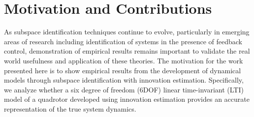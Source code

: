 \section{Motivation and Contributions}
As subspace identification techniques continue to evolve, particularly in emerging areas of research including identification of systems in the presence of feedback control, demonstration of empirical results remains important to validate the real world usefulness and application of these theories. The motivation for the work presented here is to show empirical results from the development of dynamical models through subspace identification with innovation estimation. Specifically, we analyze whether a six degree of freedom (6DOF) linear time-invariant (LTI) model of a quadrotor developed using innovation estimation provides an accurate representation of the true system dynamics.




